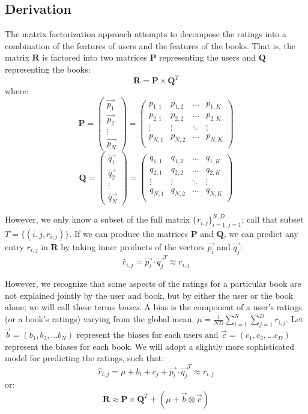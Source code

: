 \documentclass[11pt]{amsart}
\newcommand{\mat}[1]{\mathbf{#1}}
\begin{document}
\subsection{Derivation}
The matrix factorization approach attempts to decompose the ratings into a combination of the features of users and the features of the books. That is, the matrix $\mat{R}$ is factored into two matrices $\mat{P}$ representing the users and $\mat{Q}$ representing the books:
$$\mat{R} = \mat{P} \times \mat{Q}^T$$
where:
$$ 
\mat{P} = 
\begin{pmatrix}
	\vec{p_1} \\
	\vec{p_2} \\
	\vdots    \\
	\vec{p_N} 
\end{pmatrix} = 
\begin{pmatrix}
	p_{1,1} & p_{1,2} & \ldots & p_{1,K} \\
	p_{2,1} & p_{2,2} & \ldots & p_{2,K} \\
	\vdots  & \vdots  & \ddots & \vdots  \\
	p_{N,1} & p_{N,2} & \ldots & p_{N,K} \\
\end{pmatrix}
$$
$$ 
\mat{Q} = 
\begin{pmatrix}
	\vec{q_1} \\
	\vec{q_2} \\
	\vdots    \\
	\vec{q_N} 
\end{pmatrix} = 
\begin{pmatrix}
	q_{1,1} & q_{1,2} & \ldots & q_{1,K} \\
	q_{2,1} & q_{2,2} & \ldots & q_{2,K} \\
	\vdots  & \vdots  & \ddots & \vdots  \\
	q_{N,1} & q_{N,2} & \ldots & q_{N,K} \\
\end{pmatrix}
$$

However, we only know a subset of the full matrix $\{r_{i,j}\}_{i=1, j=1}^{N,D}$; call that subset $T = \{(i, j, r_{i,j})\}$. If we can produce the matrices $\mat{P}$ and $\mat{Q}$, we can predict any entry $r_{i,j}$ in $\mat{R}$ by taking inner products of the vectors $\vec{p_i}$ and $\vec{q_j}$:
$$\hat{r}_{i,j} = \vec{p_i} \cdot \vec{q_j}^T \approx r_{i,j}$$

However, we recognize that some aspects of the ratings for a particular book are not explained jointly by the user and book, but by either the user or the book alone; we will call these terms \emph{biases}. A bias is the component of a user's ratings (or a book's ratings) varying from the global mean, $\mu = \frac{1}{ND} \sum_{i=1}^{N}\sum_{j=1}^{D} r_{i,j}$. Let $\vec{b} = (b_1, b_2, \ldots b_N)$ represent the biases for each users and $\vec{c} = (c_1, c_2, \ldots c_D)$ represent the biases for each book. We will adopt a slightly more sophisticated model for predicting the ratings, such that:
$$\hat{r}_{i,j} = \mu + b_i + c_j + \vec{p_i} \cdot \vec{q_j}^T \approx r_{i,j}$$
or:
$$\mat{R} \approx \mat{P} \times \mat{Q}^T + (\mu + \vec{b} \otimes \vec{c})$$
\end{document}
